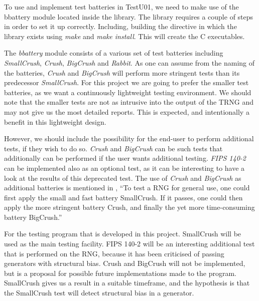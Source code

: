 \documentclass[]{final_report}
\begin{document}
\par{To use and implement test batteries in TestU01, we need to make use of the bbattery module located inside the library. The library requires a couple of steps in order to set it up correctly. Including, building the directive in which the library exists using \textit{make} and \textit{make install}. This will create the C executables.}

\par{The \textit{bbattery} module consists of a various set of test batteries including \textit{SmallCrush}, \textit{Crush}, \textit{BigCrush} and \textit{Rabbit}. As one can assume from the naming of the batteries, \textit{Crush} and \textit{BigCrush} will perform more stringent tests than its predecessor \textit{SmallCrush}. For this project we are going to prefer the smaller test batteries, as we want a continuously lightweight testing environment. We should note that the smaller tests are not as intrusive into the output of the TRNG and may not give us the most detailed reports. This is expected, and intentionally a benefit in this lightweight design.}

\par{However, we should include the possibility for the end-user to perform additional tests, if they wish to do so. \textit{Crush} and \textit{BigCrush} can be such tests that additionally can be performed if the user wants additional testing. \textit{FIPS 140-2} can be implemented also as an optional test, as it can be interesting to have a look at the results of this deprecated test. The use of \textit{Crush} and \textit{BigCrush} as additional batteries is mentioned in \cite{Ecuyer:2013}, ``To test a RNG for general use, one could first apply the small and fast battery SmallCrush. If it passes, one could then apply the more stringent battery Crush, and finally the yet more time-consuming battery BigCrush.''}

\par{For the testing program that is developed in this project. SmallCrush will be used as the main testing facility. FIPS 140-2 will be an interesting additional test that is performed on the RNG, because it has been criticised of passing generators with structural bias\cite{Smith:2020}. Crush and BigCrush will not be implemented, but is a proposal for possible future implementations made to the program. SmallCrush gives us a result in a suitable timeframe, and the hypothesis is that the SmallCrush test will detect structural bias in a generator.}
\end{document}
